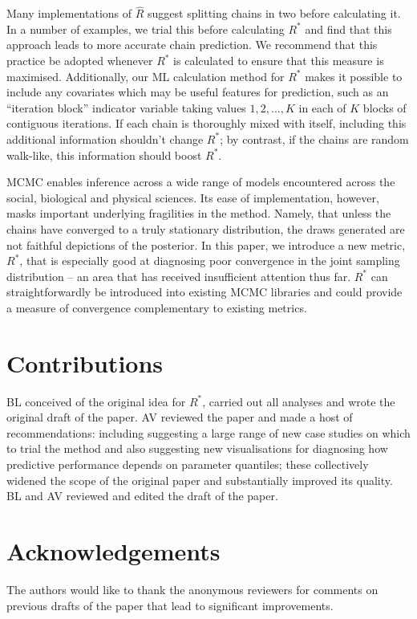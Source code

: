 \documentclass{article}
\begin{document}
Many implementations of $\widehat{R}$ suggest splitting chains in two before calculating it. In a number of examples, we trial this before calculating $R^*$ and find that this approach leads to more accurate chain prediction. We recommend that this practice be adopted whenever $R^*$ is calculated to ensure that this measure is maximised. Additionally, our ML calculation method for $R^*$ makes it possible to include any covariates which may be useful features for prediction, such as an ``iteration block'' indicator variable taking values $1, 2, ..., K$ in each of $K$ blocks of contiguous iterations. If each chain is thoroughly mixed with itself, including this additional information shouldn't change $R^*$; by contrast, if the chains are random walk-like, this information should boost $R^*$.

MCMC enables inference across a wide range of models encountered across the social, biological and physical sciences. Its ease of implementation, however, masks important underlying fragilities in the method. Namely, that unless the chains have converged to a truly stationary distribution, the draws generated are not faithful depictions of the posterior. In this paper, we introduce a new metric, $R^*$, that is especially good at diagnosing poor convergence in the joint sampling distribution -- an area that has received insufficient attention thus far. $R^*$ can straightforwardly be introduced into existing MCMC libraries and could provide a measure of convergence complementary to existing metrics.


\section{Contributions}
BL conceived of the original idea for $R^*$, carried out all analyses and wrote the original draft of the paper. AV reviewed the paper and made a host of recommendations: including suggesting a large range of new case studies on which to trial the method and also suggesting new visualisations for diagnosing how predictive performance depends on parameter quantiles; these collectively widened the scope of the original paper and substantially improved its quality. BL and AV reviewed and edited the draft of the paper.

\section{Acknowledgements}
The authors would like to thank the anonymous reviewers for comments on previous drafts of the paper that lead to significant improvements.


 


	
\end{document}
